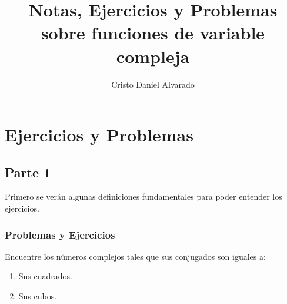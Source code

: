 \documentclass[12pt]{report}
\theoremstyle{largebreak}
\begin{document}
    \setlength{\parskip}{5pt} %
    \setlength{\parindent}{12pt} %
    \title{Notas, Ejercicios y Problemas sobre funciones de variable compleja}
    \author{Cristo Daniel Alvarado}
    \maketitle

    \tableofcontents %

    \renewcommand{\theenumi}{\roman{enumi}}

    
    \chapter{Ejercicios y Problemas}
    
    \section{Parte 1}
    
    Primero se verán algunas definiciones fundamentales para poder entender los ejercicios.
    
    \subsection{Problemas y Ejercicios}

    \begin{excer}
        Encuentre los números complejos tales que sus conjugados son iguales a:
        \begin{enumerate}
            \item Sus cuadrados.
            \item Sus cubos.
        \end{enumerate}
    \end{excer}
\end{document}
